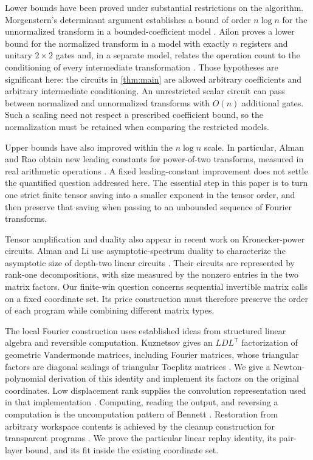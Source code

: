 Lower bounds have been proved under substantial restrictions on the
algorithm. Morgenstern's determinant argument establishes a bound of
order $n\log n$ for the unnormalized transform in a bounded-coefficient
model \citep{morgenstern1973}. Ailon proves a lower bound for the
normalized transform in a model with exactly $n$ registers and unitary
$2\times2$ gates \citep[Section~2 and Theorem~2.1]{ailon2013} and, in a
separate model, relates the operation count to the conditioning of
every intermediate transformation
\citep[Definition~2.1 and Theorem~3.1]{ailon2014}.
Those hypotheses are significant here:
the circuits in \cref{thm:main} are allowed arbitrary coefficients and
arbitrary intermediate conditioning.
An unrestricted scalar circuit can pass between normalized and
unnormalized transforms with $O(n)$ additional gates. Such a scaling
need not respect a prescribed coefficient bound, so the normalization
must be retained when comparing the restricted models.

Upper bounds have also improved within the $n\log n$ scale. In particular,
Alman and Rao obtain new leading constants for power-of-two transforms,
measured in real arithmetic operations \citep[Theorem~1.2]{almanRao2023}.
A fixed leading-constant improvement
does not settle the quantified question addressed here. The essential
step in this paper is to turn one strict finite tensor saving into a
smaller exponent in the tensor order, and then preserve that saving
when passing to an unbounded sequence of Fourier transforms.

Tensor amplification and duality also appear in recent work on
Kronecker-power circuits. Alman and Li use asymptotic-spectrum duality
to characterize the asymptotic size of depth-two linear circuits
\citep[Sections~1.3 and~4]{almanLi2025}. Their circuits are represented by rank-one
decompositions, with size measured by the nonzero entries in the two
matrix factors. Our finite-win question concerns sequential invertible
matrix calls on a fixed coordinate set. Its price construction must
therefore preserve the order of each program while combining different
matrix types.

The local Fourier construction uses established ideas from structured
linear algebra and reversible computation. Kuznetsov gives an
$LDL^{\mathsf T}$ factorization of geometric Vandermonde matrices,
including Fourier matrices, whose triangular factors are diagonal
scalings of triangular Toeplitz matrices
\citep[Theorem~1]{kuznetsov2018}. We give a Newton-polynomial derivation
of this identity and implement its factors on the original coordinates.
Low displacement rank supplies the convolution representation used in
that implementation \citep[Lemmas~1--2]{kailathKungMorf1979}.
Computing, reading the output, and reversing a computation is the
uncomputation pattern of Bennett \citep[pp.~526--529]{bennett1973}.
Restoration from arbitrary workspace contents is achieved by the
cleanup construction for transparent programs
\citep[Section~3]{buhrmanEtAl2014}. We prove the particular linear
replay identity, its pair-layer bound, and its fit inside the existing
coordinate set.

